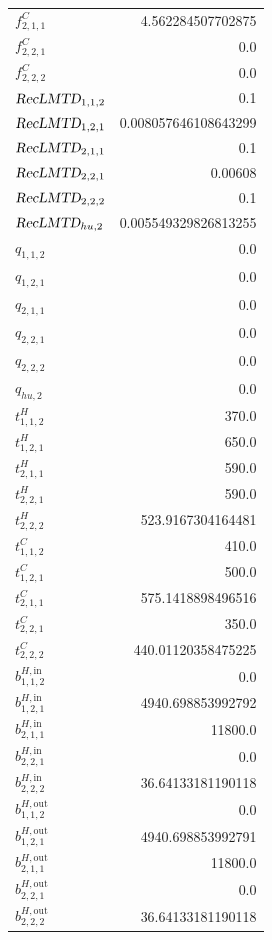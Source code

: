 \documentclass{article}%
\begin{document}
\begin{multicols*}{3}
\begin{supertabular}{lr}
	$f_{2,1,1}^{C}$ & 4.562284507702875 \\%
	$f_{2,2,1}^{C}$ & 0.0 \\%
	$f_{2,2,2}^{C}$ & 0.0 \\%
	$\textsl{RecLMTD}_{1,1,2}$ & 0.1 \\%
	$\textsl{RecLMTD}_{1,2,1}$ & 0.008057646108643299 \\%
	$\textsl{RecLMTD}_{2,1,1}$ & 0.1 \\%
	$\textsl{RecLMTD}_{2,2,1}$ & 0.00608 \\%
	$\textsl{RecLMTD}_{2,2,2}$ & 0.1 \\%
	$\textsl{RecLMTD}_{hu,2}$ & 0.005549329826813255 \\%
	$q_{1,1,2}$ & 0.0 \\%
	$q_{1,2,1}$ & 0.0 \\%
	$q_{2,1,1}$ & 0.0 \\%
	$q_{2,2,1}$ & 0.0 \\%
	$q_{2,2,2}$ & 0.0 \\%
	$q_{hu,2}$ & 0.0 \\%
	$t_{1,1,2}^{H}$ & 370.0 \\%
	$t_{1,2,1}^{H}$ & 650.0 \\%
	$t_{2,1,1}^{H}$ & 590.0 \\%
	$t_{2,2,1}^{H}$ & 590.0 \\%
	$t_{2,2,2}^{H}$ & 523.9167304164481 \\%
	$t_{1,1,2}^{C}$ & 410.0 \\%
	$t_{1,2,1}^{C}$ & 500.0 \\%
	$t_{2,1,1}^{C}$ & 575.1418898496516 \\%
	$t_{2,2,1}^{C}$ & 350.0 \\%
	$t_{2,2,2}^{C}$ & 440.01120358475225 \\%
	$b_{1,1,2}^{H,\text{in}}$ & 0.0 \\%
	$b_{1,2,1}^{H,\text{in}}$ & 4940.698853992792 \\%
	$b_{2,1,1}^{H,\text{in}}$ & 11800.0 \\%
	$b_{2,2,1}^{H,\text{in}}$ & 0.0 \\%
	$b_{2,2,2}^{H,\text{in}}$ & 36.64133181190118 \\%
	$b_{1,1,2}^{H,\text{out}}$ & 0.0 \\%
	$b_{1,2,1}^{H,\text{out}}$ & 4940.698853992791 \\%
	$b_{2,1,1}^{H,\text{out}}$ & 11800.0 \\%
	$b_{2,2,1}^{H,\text{out}}$ & 0.0 \\%
	$b_{2,2,2}^{H,\text{out}}$ & 36.64133181190118 \\%

\end{supertabular}
\end{multicols*}
\end{document}
